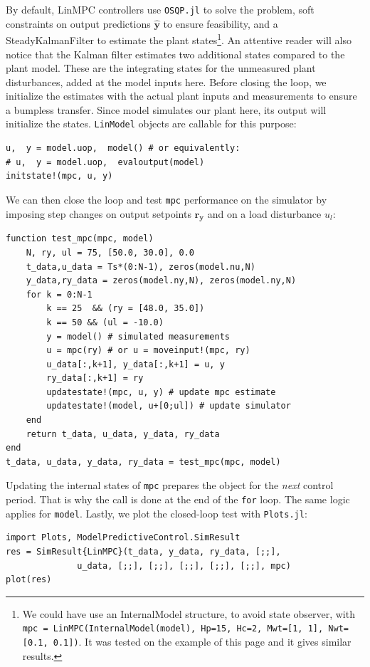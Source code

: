 By default, LinMPC controllers use \texttt{OSQP.jl} to solve the problem, soft constraints on output predictions $\mathbf{\hat y}$ to ensure feasibility, and a SteadyKalmanFilter to estimate the plant states\footnote{We could have use an InternalModel structure, to avoid state observer, with \texttt{mpc = LinMPC(InternalModel(model), Hp=15, Hc=2, Mwt=[1, 1], Nwt=[0.1, 0.1])}. It was tested on the example of this page and it gives similar results.}. An attentive reader will also notice that the Kalman filter estimates two additional states compared to the plant model. These are the integrating states for the unmeasured plant disturbances, added at the model inputs here.  Before closing the loop, we initialize the estimates with the actual plant inputs and measurements to ensure a bumpless transfer. Since model simulates our plant here, its output will initialize the states. \texttt{LinModel} objects are callable for this purpose:

\begin{verbatim}
u,  y = model.uop,  model() # or equivalently: 
# u,  y = model.uop,  evaloutput(model)
initstate!(mpc, u, y)
\end{verbatim}

We can then close the loop and test \texttt{mpc} performance on the simulator by imposing step changes on output setpoints $\mathbf{r_y}$ and on a load disturbance $u_l$:

\begin{verbatim}
function test_mpc(mpc, model)
    N, ry, ul = 75, [50.0, 30.0], 0.0
    t_data,u_data = Ts*(0:N-1), zeros(model.nu,N)
    y_data,ry_data = zeros(model.ny,N), zeros(model.ny,N)
    for k = 0:N-1
        k == 25  && (ry = [48.0, 35.0])
        k == 50 && (ul = -10.0)
        y = model() # simulated measurements
        u = mpc(ry) # or u = moveinput!(mpc, ry)
        u_data[:,k+1], y_data[:,k+1] = u, y
        ry_data[:,k+1] = ry
        updatestate!(mpc, u, y) # update mpc estimate
        updatestate!(model, u+[0;ul]) # update simulator
    end
    return t_data, u_data, y_data, ry_data
end
t_data, u_data, y_data, ry_data = test_mpc(mpc, model)
\end{verbatim}

Updating the internal states of \texttt{mpc} prepares the object for the \emph{next} control period. That is why the call is done at the end of the \texttt{for} loop. The same logic applies for \texttt{model}. Lastly, we plot the closed-loop test with \texttt{Plots.jl}:

\begin{verbatim}
import Plots, ModelPredictiveControl.SimResult
res = SimResult{LinMPC}(t_data, y_data, ry_data, [;;], 
              u_data, [;;], [;;], [;;], [;;], [;;], mpc)
plot(res)
\end{verbatim}

